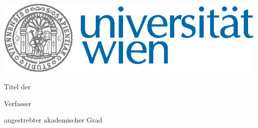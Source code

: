 \begin{titlepage}

\vspace*{-3cm}  %
\begin{flushright}
    \includegraphics{figures/uni_logo_farbe_02}
\end{flushright}
\vspace{1cm}
\linespread{1.3}
\begin{center}  %
    \Huge{\textbf{\textsf{\MakeUppercase{
        \myworktitle
    }}}}
    \vspace{2cm}

    \large{\textsf{  %
        Titel der \myworktitle
    }}
    \vspace{.1cm}

    \LARGE{\textsf{  %
        \mytitle 
        \mysubtitle
    }}
    \vspace{1.5cm}

    \large{\textsf{  %
        Verfasser
    }}

    \Large{\textsf{  %
        \myauthor
    }}
    \vspace{1.5cm}

    \large{\textsf{
        angestrebter akademischer Grad  %
    }}

    \Large{\textsf{  %
        \mygrade
    }}
\end{center}
\vspace{2cm}


\end{titlepage}

